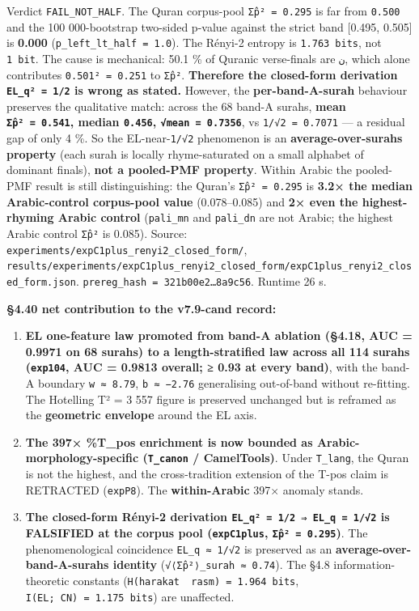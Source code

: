 \documentclass[
]{article}
\providecommand{\tightlist}{%
  \setlength{\itemsep}{0pt}\setlength{\parskip}{0pt}}
\begin{document}
Verdict \texttt{FAIL\_NOT\_HALF}. The Quran corpus-pool
\texttt{Σp̂²\ =\ 0.295} is far from \texttt{0.500} and the 100
000-bootstrap two-sided p-value against the strict band {[}0.495,
0.505{]} is \textbf{0.000} (\texttt{p\_left\_lt\_half\ =\ 1.0}). The
Rényi-2 entropy is \texttt{1.763\ bits}, not \texttt{1\ bit}. The cause
is mechanical: 50.1 \% of Quranic verse-finals are \texttt{ن}, which
alone contributes \texttt{0.501²\ =\ 0.251} to \texttt{Σp̂²}.
\textbf{Therefore the closed-form derivation \texttt{EL\_q²\ =\ 1/2} is
wrong as stated.} However, the \textbf{per-band-A-surah} behaviour
preserves the qualitative match: across the 68 band-A surahs,
\textbf{mean \texttt{Σp̂²\ =\ 0.541}, median \texttt{0.456},
\texttt{√mean\ =\ 0.7356}}, vs \texttt{1/√2\ =\ 0.7071} --- a residual
gap of only 4 \%. So the EL-near-\texttt{1/√2} phenomenon is an
\textbf{average-over-surahs property} (each surah is locally
rhyme-saturated on a small alphabet of dominant finals), \textbf{not a
pooled-PMF property}. Within Arabic the pooled-PMF result is still
distinguishing: the Quran's \texttt{Σp̂²\ =\ 0.295} is \textbf{3.2× the
median Arabic-control corpus-pool value} (0.078--0.085) and \textbf{2×
even the highest-rhyming Arabic control} (\texttt{pali\_mn} and
\texttt{pali\_dn} are not Arabic; the highest Arabic control
\texttt{Σp̂²} is 0.085). Source:
\texttt{experiments/expC1plus\_renyi2\_closed\_form/},
\texttt{results/experiments/expC1plus\_renyi2\_closed\_form/expC1plus\_renyi2\_closed\_form.json}.
\texttt{prereg\_hash\ =\ 321b00e2…8a9c56}. Runtime 26 s.

\textbf{§4.40 net contribution to the v7.9-cand record:}

\begin{enumerate}
\def\labelenumi{\arabic{enumi}.}
\tightlist
\item
  \textbf{EL one-feature law promoted from band-A ablation (§4.18, AUC =
  0.9971 on 68 surahs) to a length-stratified law across all 114 surahs
  (\texttt{exp104}, AUC = 0.9813 overall; ≥ 0.93 at every band)}, with
  the band-A boundary \texttt{w\ ≈\ 8.79}, \texttt{b\ ≈\ −2.76}
  generalising out-of-band without re-fitting. The Hotelling T² = 3 557
  figure is preserved unchanged but is reframed as the \textbf{geometric
  envelope} around the EL axis.
\item
  \textbf{The 397× \%T\_pos enrichment is now bounded as
  Arabic-morphology-specific (\texttt{T\_canon} / CamelTools)}. Under
  \texttt{T\_lang}, the Quran is not the highest, and the
  cross-tradition extension of the T-pos claim is RETRACTED
  (\texttt{expP8}). The \textbf{within-Arabic} 397× anomaly stands.
\item
  \textbf{The closed-form Rényi-2 derivation
  \texttt{EL\_q²\ =\ 1/2\ ⇒\ EL\_q\ =\ 1/√2} is FALSIFIED at the corpus
  pool (\texttt{expC1plus}, \texttt{Σp̂²\ =\ 0.295})}. The
  phenomenological coincidence \texttt{EL\_q\ ≈\ 1/√2} is preserved as
  an \textbf{average-over-band-A-surahs identity}
  (\texttt{√⟨Σp̂²⟩\_surah\ ≈\ 0.74}). The §4.8 information-theoretic
  constants (\texttt{H(harakat\ \textbar{}\ rasm)\ =\ 1.964\ bits},
  \texttt{I(EL;\ CN)\ =\ 1.175\ bits}) are unaffected.
\end{enumerate}
\end{document}
